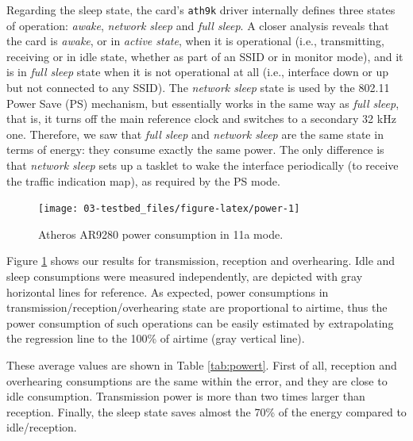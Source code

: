 \documentclass[twoside,nohyper]{tufte-book}
\theoremstyle{definition}
\theoremstyle{definition}
\theoremstyle{definition}
\theoremstyle{remark}
\begin{document}
Regarding the sleep state, the card's \texttt{ath9k} driver internally
defines three states of operation: \emph{awake}, \emph{network sleep}
and \emph{full sleep}. A closer analysis reveals that the card is
\emph{awake}, or in \emph{active state}, when it is operational (i.e.,
transmitting, receiving or in idle state, whether as part of an SSID or
in monitor mode), and it is in \emph{full sleep} state when it is not
operational at all (i.e., interface down or up but not connected to any
SSID). The \emph{network sleep} state is used by the 802.11 Power Save
(PS) mechanism, but essentially works in the same way as \emph{full
sleep}, that is, it turns off the main reference clock and switches to a
secondary 32 kHz one. Therefore, we saw that \emph{full sleep} and
\emph{network sleep} are the same state in terms of energy: they consume
exactly the same power. The only difference is that \emph{network sleep}
sets up a tasklet to wake the interface periodically (to receive the
traffic indication map), as required by the PS mode.



\begin{figure}

{\centering \texttt{[image: 03-testbed\_files/figure-latex/power-1]} 

}

\caption[Atheros AR9280 power consumption in 11a mode.]{Atheros AR9280 power consumption in 11a mode.}\label{fig:power}
\end{figure}

Figure \ref{fig:power} shows our results for transmission, reception and
overhearing. Idle and sleep consumptions were measured independently,
are depicted with gray horizontal lines for reference. As expected,
power consumptions in transmission/reception/overhearing state are
proportional to airtime, thus the power consumption of such operations
can be easily estimated by extrapolating the regression line to the
100\% of airtime (gray vertical line).

These average values are shown in Table \ref{tab:powert}. First of all,
reception and overhearing consumptions are the same within the error,
and they are close to idle consumption. Transmission power is more than
two times larger than reception. Finally, the sleep state saves almost
the 70\% of the energy compared to idle/reception.
\end{document}
